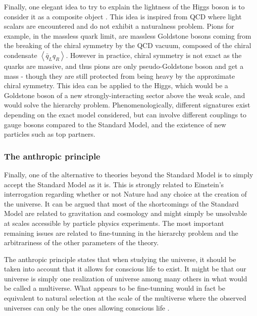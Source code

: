     Finally, one elegant idea to try to explain the lightness of the Higgs boson
    is to consider it as a composite object \cite{LittleHiggs, CompositeHiggs}.
    This idea is inspired from QCD where light scalars are encountered and do
    not exhibit a naturalness problem. Pions for example, in the massless quark
    limit, are massless Goldstone bosons coming from the breaking of the chiral
    symmetry by the QCD vacuum, composed of the chiral condensate
    $\left<\bar{q}_L q_R\right>$. However in practice, chiral symmetry is not
    exact as the quarks are massive, and thus pions are only pseudo-Goldstone
    boson and get a mass - though they are still protected from being heavy by
    the approximate chiral symmetry. This idea can be applied to the Higgs,
    which would be a Goldstone boson of a new strongly-interacting sector above
    the weak scale, and would solve the hierarchy problem. Phenomenologically,
    different signatures exist depending on the exact model considered, but can
    involve different couplings to gauge bosons compared to the Standard Model,
    and the existence of new particles such as top partners.

        \subsubsection{The anthropic principle}

    Finally, one of the alternative to theories beyond the Standard Model is to
    simply accept the Standard Model as it is. This is strongly related to
    Einstein's interrogation regarding whether or not Nature had any choice at
    the creation of the universe. It can be argued that most of the shortcomings
    of the Standard Model are related to gravitation and cosmology and might
    simply be unsolvable at scales accessible by particle physics experiments.
    The most important remaining issues are related to fine-tunning in the
    hierarchy problem and the arbitrariness of the other parameters of the
    theory.

    The anthropic principle states that when studying the universe, it should be
    taken into account that it allows for conscious life to exist. It might be
    that our universe is simply one realization of universe among many others in
    what would be called a multiverse. What appears to be fine-tunning would in
    fact be equivalent to natural selection at the scale of the multiverse where
    the observed universes can only be the ones allowing conscious life
    \cite{AnthropicPrincipleBarrow, StarsInOtherUniverses}.

